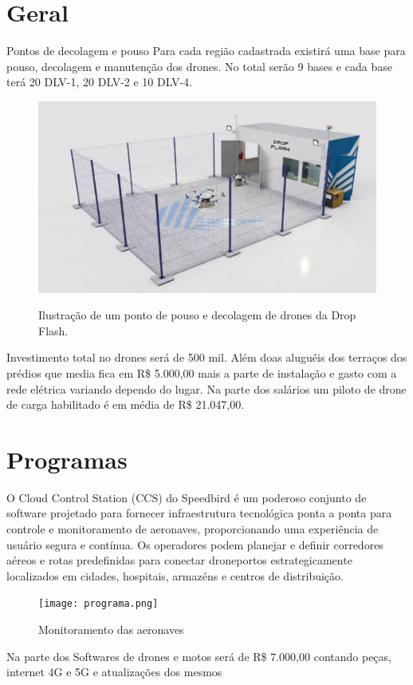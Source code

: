 \section{Geral}

Pontos de decolagem e pouso Para cada região cadastrada existirá uma base para pouso, decolagem e manutenção dos drones. No total serão 9 bases e cada base terá 20 DLV-1, 20 DLV-2 e 10 DLV-4.

\begin{figure} [!ht]
    \centering
    \caption{Ilustração de um ponto de pouso e decolagem de drones da Drop Flash.}
    \includegraphics[width=0.4\linewidth]{figuras/p dec e po.png}
    \label{fig:enter-label}
\end{figure}

Investimento total no drones será de 500 mil. Além doas aluguéis dos terraços dos prédios que media fica em R\$ 5.000,00 mais a parte de instalação e gasto com a rede elétrica variando dependo do lugar. Na parte dos salários um piloto de drone de carga habilitado é em média de R\$ 21.047,00.

\section{Programas}
O Cloud Control Station (CCS) do Speedbird é um poderoso conjunto de software projetado para fornecer infraestrutura tecnológica ponta a ponta para controle e monitoramento de aeronaves, proporcionando uma experiência de usuário segura e contínua. Os operadores podem planejar e definir corredores aéreos e rotas predefinidas para conectar droneportos estrategicamente localizados em cidades, hospitais, armazéns e centros de distribuição.

\begin{figure}[!ht]
  {  \centering
    \caption{Monitoramento das aeronaves}
    \texttt{[image: programa.png]}
    \label{fig:enter-label}
    }
\end{figure}

Na parte dos Softwares de drones e motos será de R\$ 7.000,00 contando peças, internet 4G e 5G e atualizações dos mesmos
